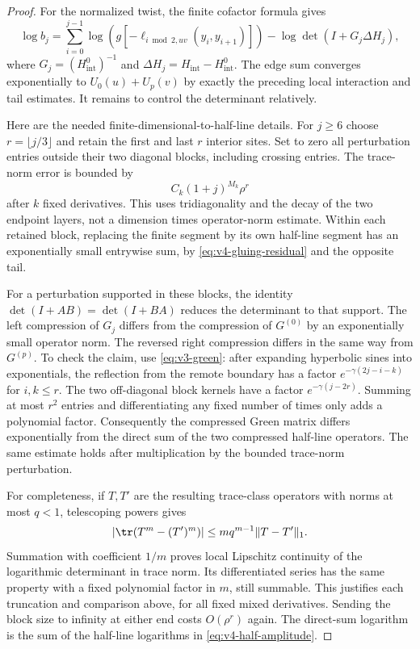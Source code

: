 \begin{proof}
For the normalized twist, the finite cofactor formula gives
\begin{equation}\label{eq:v4-finite-log}
 \log b_j=
 \sum_{i=0}^{j-1}\log(g[-\ell_{i\bmod2,uv}(y_i,y_{i+1})])
 -\log\det(I+G_j\Delta H_j),
\end{equation}
where $G_j=(H^0_{\mathrm{int}})^{-1}$ and
$\Delta H_j=H_{\mathrm{int}}-H^0_{\mathrm{int}}$.
The edge sum converges exponentially to $U_0(u)+U_p(v)$ by exactly
the preceding local interaction and tail estimates. It remains to
control the determinant relatively.

Here are the needed finite-dimensional-to-half-line details. For
$j\ge6$ choose $r=\lfloor j/3\rfloor$ and retain the first and last
$r$ interior sites. Set to zero all perturbation entries outside their
two diagonal blocks, including crossing entries. The trace-norm error
is bounded by
\begin{equation}\label{eq:v4-det-tail}
 C_k(1+j)^{M_k}\rho^r
\end{equation}
after $k$ fixed derivatives. This uses tridiagonality and the decay of
the two endpoint layers, not a dimension times operator-norm estimate.
Within each retained block, replacing the finite segment by its own
half-line segment has an exponentially small entrywise sum, by
\eqref{eq:v4-gluing-residual} and the opposite tail.

For a perturbation supported in these blocks, the identity
$\det(I+AB)=\det(I+BA)$ reduces the determinant to that support.
The left compression of $G_j$ differs from the compression of
$G^{(0)}$ by an exponentially small operator norm. The reversed right
compression differs in the same way from $G^{(p)}$. To check the claim,
use \eqref{eq:v3-green}: after expanding hyperbolic sines into
exponentials, the reflection from the remote boundary has a factor
$e^{-\gamma(2j-i-k)}$ for $i,k\le r$. The two off-diagonal block
kernels have a factor $e^{-\gamma(j-2r)}$. Summing at most $r^2$
entries and differentiating any fixed number of times only adds a
polynomial factor. Consequently the compressed Green matrix differs
exponentially from the direct sum of the two compressed half-line
operators. The same estimate holds after multiplication by the bounded
trace-norm perturbation.

For completeness, if $T,T'$ are the resulting trace-class operators
with norms at most $q<1$, telescoping powers gives
\[
 |\tr(T^m-(T')^m)|\le m q^{m-1}\|T-T'\|_1.
\]
Summation with coefficient $1/m$ proves local Lipschitz continuity of
the logarithmic determinant in trace norm. Its differentiated series
has the same property with a fixed polynomial factor in $m$, still
summable. This justifies each truncation and comparison above, for all
fixed mixed derivatives. Sending the block size to infinity at either
end costs $O(\rho^r)$ again. The direct-sum logarithm is the sum of
the half-line logarithms in \eqref{eq:v4-half-amplitude}.


\end{proof}
